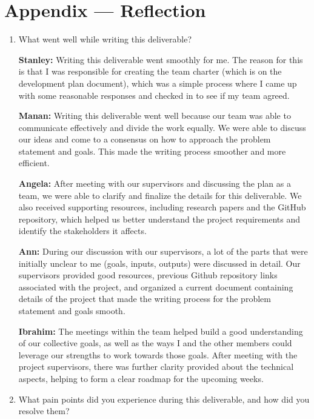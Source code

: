 \documentclass{article}
\begin{document}
\newpage{}

\section*{Appendix --- Reflection}

\begin{enumerate}
    \item What went well while writing this deliverable? 
    
\textbf{Stanley:} Writing this deliverable went smoothly for me. The reason for this is that I was responsible for creating the team charter (which is on the development plan document), which was a simple process where I came up with some reasonable responses and checked in to see if my team agreed.

\textbf{Manan:} Writing this deliverable went well because our team was able to communicate effectively and divide the work equally. We were able to discuss our ideas and come to a consensus on how to approach the problem statement and goals. This made the writing process smoother and more efficient.

\textbf{Angela:} After meeting with our supervisors and discussing the plan as a team, we were able to clarify and finalize the details for this deliverable. We also received supporting resources, including research papers and the GitHub repository, which helped us better understand the project requirements and identify the stakeholders it affects.

\textbf{Ann:} During our discussion with our supervisors, a lot of the parts that were initially unclear to me (goals, inputs, outputs) were discussed in detail. Our supervisors provided good resources, previous Github repository links associated with the project, and organized a current document containing details of the project that made the writing process for the problem statement and goals smooth. 

\textbf{Ibrahim:} The meetings within the team helped build a good understanding of our collective goals, as well as the ways I and the other members could leverage our strengths to work towards those goals. After meeting with the project supervisors, there was further clarity provided about the technical aspects, helping to form a clear roadmap for the upcoming weeks.

    \item What pain points did you experience during this deliverable, and how
    did you resolve them?


\end{enumerate}
\end{document}
